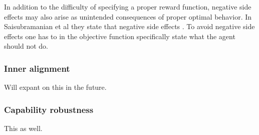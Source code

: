 \documentclass[12pt,A4]{report}
\newcommand{\autobaj}{}
\theoremstyle{definition}
\begin{document}
In addition to the difficulty of specifying a proper reward function, negative side effects may also arise as unintended consequences of proper optimal behavior. In \autobaj{Saisubramanian et al} they state that negative side effects . To avoid negative side effects one has to in the objective function specifically state what the agent should not do.

\subsubsection{Inner alignment}
Will expant on this in the future.

\subsubsection{Capability robustness}
This as well.



\end{document}
